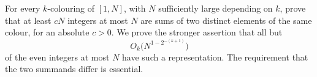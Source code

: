 For every $k$-colouring of $[1,N]$, with $N$ sufficiently large depending on $k$, prove that at least $cN$ integers at most $N$ are sums of two distinct elements of the same colour, for an absolute $c>0$. We prove the stronger assertion that all but
\[O_k\bigl(N^{1-2^{-(k+1)}}\bigr)\]
of the even integers at most $N$ have such a representation. The requirement that the two summands differ is essential.
